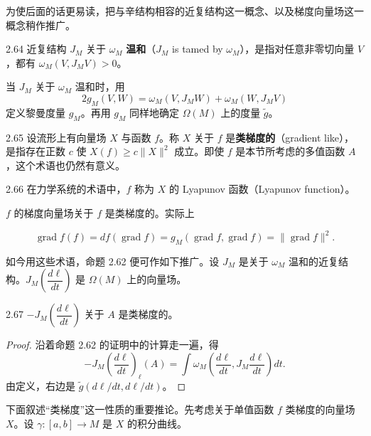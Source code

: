 为使后面的话更易读，把与辛结构相容的近复结构这一概念、以及梯度向量场这一概念稍作推广。

\begin{definition}{2.64}
  近复结构 $J_M$ 关于 $\omega_M$ \textbf{温和}（$J_M$ is tamed by $\omega_M$），是指对任意非零切向量 $V$，都有 $\omega_M(V,J_MV)>0$。
\end{definition}

当 $J_M$ 关于 $\omega_M$ 温和时，用
\[
  2g_M(V,W)=\omega_M(V,J_MW)+\omega_M(W,J_MV)
\]
定义黎曼度量 $g_M$。再用 $g_M$ 同样地确定 $\Omega(M)$ 上的度量 $\tilde g$。

\begin{definition}{2.65}
  设流形上有向量场 $X$ 与函数 $f$。称 $X$ 关于 $f$ 是\textbf{类梯度的}（gradient like），是指存在正数 $c$ 使 $X(f)\ge c\|X\|^2$ 成立。即使 $f$ 是本节所考虑的多值函数 $A$，这个术语也仍然有意义。
\end{definition}

\begin{remark}{2.66}
  在力学系统的术语中，$f$ 称为 $X$ 的 Lyapunov 函数（Lyapunov function）。
\end{remark}


$f$ 的梯度向量场关于 $f$ 是类梯度的。实际上

\[
  \operatorname{grad}f(f)=df(\operatorname{grad}f)=g_M(\operatorname{grad}f,\operatorname{grad}f)=\|\operatorname{grad}f\|^2 .
\]

如今用这些术语，命题 2.62 便可作如下推广。设 $J_M$ 是关于 $\omega_M$ 温和的近复结构。$J_M\left(\dfrac{d\ell}{dt}\right)$ 是 $\Omega(M)$ 上的向量场。

\begin{lemma*}{2.67}
  $-J_M\left(\dfrac{d\ell}{dt}\right)$ 关于 $A$ 是类梯度的。
\end{lemma*}

\begin{proof}
  沿着命题 2.62 的证明中的计算走一遍，得
  \[
    -J_M\left(\frac{d\ell}{dt}\right)_\ell(A)
    =\int\omega_M\left(\frac{d\ell}{dt},J_M\frac{d\ell}{dt}\right)dt .
  \]
  由定义，右边是 $\tilde g(d\ell/dt,d\ell/dt)$。
\end{proof}

下面叙述“类梯度”这一性质的重要推论。先考虑关于单值函数 $f$ 类梯度的向量场 $X$。设 $\gamma\colon[a,b]\to M$ 是 $X$ 的积分曲线。

